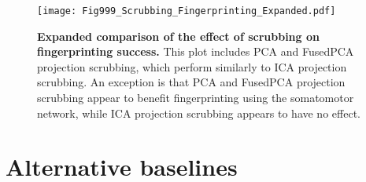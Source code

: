\documentclass{article}
\begin{document}


\begin{figure}
    \centering
    \texttt{[image: Fig999\_Scrubbing\_Fingerprinting\_Expanded.pdf]}
    \caption{\small \textbf{Expanded comparison of the effect of scrubbing on fingerprinting success.} This plot includes PCA and FusedPCA projection scrubbing, which perform similarly to ICA projection scrubbing. An exception is that PCA and FusedPCA projection scrubbing appear to benefit fingerprinting using the somatomotor network, while ICA projection scrubbing appears to have no effect.}
    \label{app:fig:scrubFingerprintExpanded}
\end{figure}


\newpage
\section{Alternative baselines}
\label{app:baselines}
\end{document}
